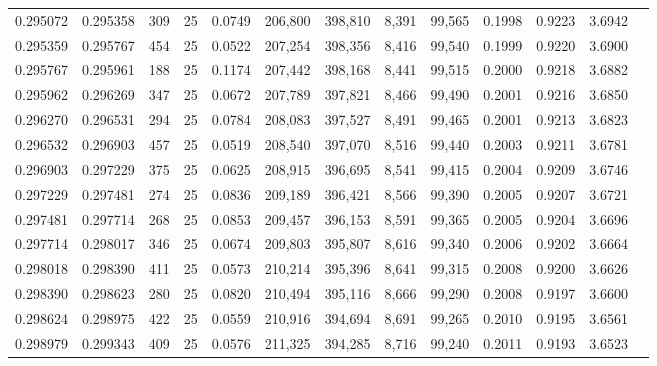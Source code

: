 \begin{tabular}{rrrrrrrrrrrrr}
0.295072 & 0.295358 &   309 &  25 &                                     0.0749 & 206,800 & 398,810 &   8,391 &  99,565 & 0.1998 & 0.9223 & 3.6942 \\
0.295359 & 0.295767 &   454 &  25 &                                     0.0522 & 207,254 & 398,356 &   8,416 &  99,540 & 0.1999 & 0.9220 & 3.6900 \\
0.295767 & 0.295961 &   188 &  25 &                                     0.1174 & 207,442 & 398,168 &   8,441 &  99,515 & 0.2000 & 0.9218 & 3.6882 \\
0.295962 & 0.296269 &   347 &  25 &                                     0.0672 & 207,789 & 397,821 &   8,466 &  99,490 & 0.2001 & 0.9216 & 3.6850 \\
0.296270 & 0.296531 &   294 &  25 &                                     0.0784 & 208,083 & 397,527 &   8,491 &  99,465 & 0.2001 & 0.9213 & 3.6823 \\
0.296532 & 0.296903 &   457 &  25 &                                     0.0519 & 208,540 & 397,070 &   8,516 &  99,440 & 0.2003 & 0.9211 & 3.6781 \\
0.296903 & 0.297229 &   375 &  25 &                                     0.0625 & 208,915 & 396,695 &   8,541 &  99,415 & 0.2004 & 0.9209 & 3.6746 \\
0.297229 & 0.297481 &   274 &  25 &                                     0.0836 & 209,189 & 396,421 &   8,566 &  99,390 & 0.2005 & 0.9207 & 3.6721 \\
0.297481 & 0.297714 &   268 &  25 &                                     0.0853 & 209,457 & 396,153 &   8,591 &  99,365 & 0.2005 & 0.9204 & 3.6696 \\
0.297714 & 0.298017 &   346 &  25 &                                     0.0674 & 209,803 & 395,807 &   8,616 &  99,340 & 0.2006 & 0.9202 & 3.6664 \\
0.298018 & 0.298390 &   411 &  25 &                                     0.0573 & 210,214 & 395,396 &   8,641 &  99,315 & 0.2008 & 0.9200 & 3.6626 \\
0.298390 & 0.298623 &   280 &  25 &                                     0.0820 & 210,494 & 395,116 &   8,666 &  99,290 & 0.2008 & 0.9197 & 3.6600 \\
0.298624 & 0.298975 &   422 &  25 &                                     0.0559 & 210,916 & 394,694 &   8,691 &  99,265 & 0.2010 & 0.9195 & 3.6561 \\
0.298979 & 0.299343 &   409 &  25 &                                     0.0576 & 211,325 & 394,285 &   8,716 &  99,240 & 0.2011 & 0.9193 & 3.6523 \\

\end{tabular}
